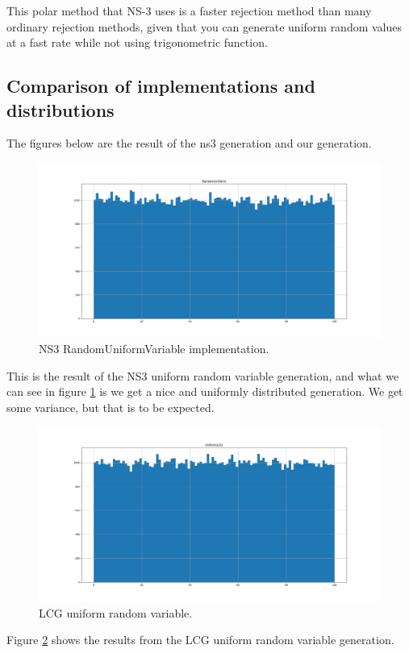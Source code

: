 \documentclass{article}
\begin{document}
  This polar method that NS-3 uses is a faster rejection method than many ordinary rejection methods, given that you can generate uniform random values at a fast rate while not using trigonometric function. 
  \subsection{Comparison of implementations and distributions}
  The figures below are the result of the ns3 generation and our generation.
  \begin{figure}[h!]
    \centering
    \includegraphics[width=\linewidth]{ns3uniform.png}
    \caption{NS3 RandomUniformVariable implementation.}
    \label{fig:ns3ruv}
  \end{figure}
  This is the result of the NS3 uniform random variable generation, and what we can see in figure \ref{fig:ns3ruv} is we get a nice and uniformly distributed generation.
  We get some variance, but that is to be expected.
  \begin{figure}[h!]
    \centering
    \includegraphics[width=\linewidth]{uniformLCG.png}
    \caption{LCG uniform random variable.}
    \label{fig:lcgruv}
  \end{figure}
  Figure \ref{fig:lcgruv} shows the results from the LCG uniform random variable generation.
\end{document}
